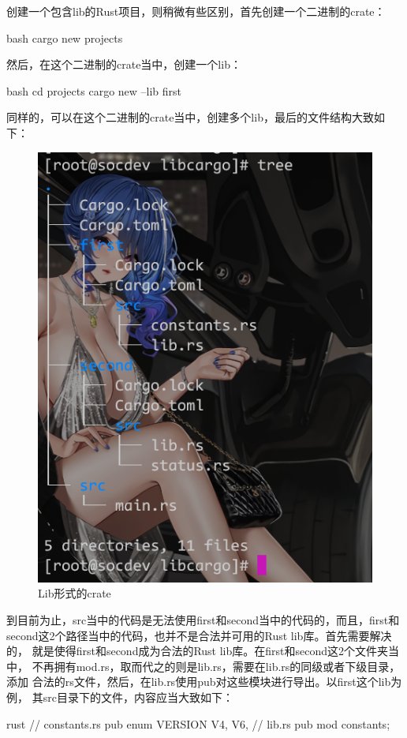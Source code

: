 创建一个包含lib的Rust项目，则稍微有些区别，首先创建一个二进制的crate：
\begin{code-block}{bash}
cargo new projects
\end{code-block}
然后，在这个二进制的crate当中，创建一个lib：
\begin{code-block}{bash}
cd projects
cargo new --lib first
\end{code-block}
同样的，可以在这个二进制的crate当中，创建多个lib，最后的文件结构大致如下：
\begin{figure}[H]
  \centering
  \includegraphics[width=\linewidth]{rust_lib.png}
  \caption{Lib形式的crate}
  \label{fig:rust_lib}
\end{figure}

到目前为止，src当中的代码是无法使用first和second当中的代码的，而且，first和
second这2个路径当中的代码，也并不是合法并可用的Rust lib库。首先需要解决的，
就是使得first和second成为合法的Rust lib库。在first和second这2个文件夹当中，
不再拥有mod.rs，取而代之的则是lib.rs，需要在lib.rs的同级或者下级目录，添加
合法的rs文件，然后，在lib.rs使用pub对这些模块进行导出。以first这个lib为例，
其src目录下的文件，内容应当大致如下：
\begin{code-block}{rust}
// constants.rs
pub enum VERSION {
    V4,
    V6,
}
// lib.rs
pub mod constants;
\end{code-block}

